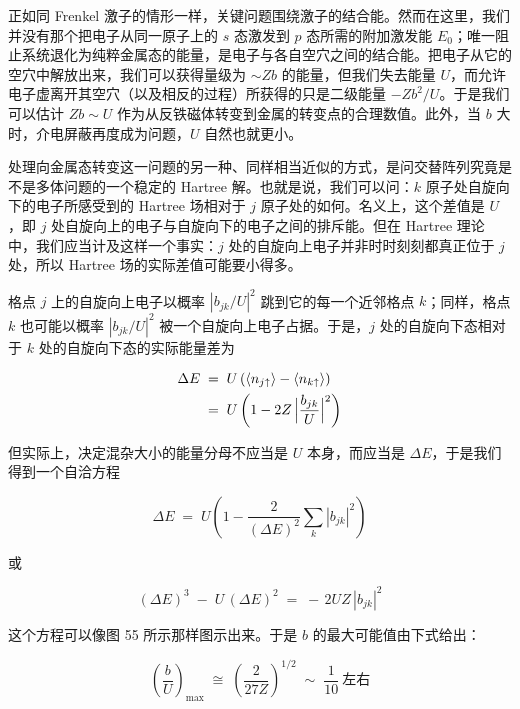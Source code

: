 正如同 Frenkel 激子的情形一样，关键问题围绕激子的结合能。然而在这里，我们并没有那个把电子从同一原子上的 $s$ 态激发到 $p$ 态所需的附加激发能 $E_0$；唯一阻止系统退化为纯粹金属态的能量，是电子与各自空穴之间的结合能。把电子从它的空穴中解放出来，我们可以获得量级为 $\sim Zb$ 的能量，但我们失去能量 $U$，而允许电子虚离开其空穴（以及相反的过程）所获得的只是二级能量 $-Zb^{2}/U$。于是我们可以估计 $Zb \sim U$ 作为从反铁磁体转变到金属的转变点的合理数值。此外，当 $b$ 大时，介电屏蔽再度成为问题，$U$ 自然也就更小。

处理向金属态转变这一问题的另一种、同样相当近似的方式，是问交替阵列究竟是不是多体问题的一个稳定的 Hartree 解。也就是说，我们可以问：$k$ 原子处自旋向下的电子所感受到的 Hartree 场相对于 $j$ 原子处的如何。名义上，这个差值是 $U$，即 $j$ 处自旋向上的电子与自旋向下的电子之间的排斥能。但在 Hartree 理论中，我们应当计及这样一个事实：$j$ 处的自旋向上电子并非时时刻刻都真正位于 $j$ 处，所以 Hartree 场的实际差值可能要小得多。

格点 $j$ 上的自旋向上电子以概率 $|b_{jk}/U|^{2}$ 跳到它的每一个近邻格点 $k$；同样，格点 $k$ 也可能以概率 $|b_{jk}/U|^{2}$ 被一个自旋向上电子占据。于是，$j$ 处的自旋向下态相对于 $k$ 处的自旋向下态的实际能量差为

\begin{align*}
\Delta E \;&=\; U\left(\langle n_{j\uparrow}\rangle - \langle n_{k\uparrow}\rangle\right) \\
&=\; U\left(1 - 2Z\,\Bigl|\frac{b_{jk}}{U}\Bigr|^{2}\right)
\end{align*}

但实际上，决定混杂大小的能量分母不应当是 $U$ 本身，而应当是 $\Delta E$，于是我们得到一个自洽方程

\begin{equation*}
\Delta E \;=\; U\left(1 - \frac{2}{(\Delta E)^{2}} \sum_{k} |b_{jk}|^{2}\right)
\end{equation*}

或

\begin{equation*}
(\Delta E)^{3} \;-\; U\,(\Delta E)^{2} \;=\; -\,2UZ\,|b_{jk}|^{2}
\end{equation*}

这个方程可以像图 55 所示那样图示出来。于是 $b$ 的最大可能值由下式给出：

\begin{equation*}
\left(\frac{b}{U}\right)_{\max} \;\cong\; \left(\frac{2}{27Z}\right)^{1/2} \;\sim\; \frac{1}{10}\ \text{左右}
\end{equation*}

